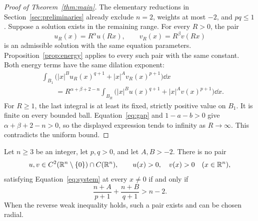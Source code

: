 \begin{proof}[Proof of Theorem~\ref{thm:main}]
The elementary reductions in Section~\ref{sec:preliminaries} already
exclude \(n=2\), weights at most \(-2\), and \(pq\le1\).
Suppose a solution exists in the remaining range. For every \(R>0\),
the pair
\[
 u_R(x)=R^\alpha u(Rx),\qquad v_R(x)=R^\beta v(Rx)
\]
is an admissible solution with the same equation parameters.
Proposition~\ref{prop:energy} applies to every such pair with the same
constant. Both energy terms have the same dilation exponent:
\begin{align*}
 &\int_{B_1}
   \bigl(|x|^B u_R(x)^{q+1}+|x|^A v_R(x)^{p+1}\bigr)\dd x\\
 &\hspace{2em}
 =R^{\alpha+\beta+2-n}
   \int_{B_R}\bigl(|x|^B u(x)^{q+1}+|x|^A v(x)^{p+1}\bigr)\dd x.
\end{align*}
For \(R\ge1\), the last integral is at least its fixed, strictly
positive value on \(B_1\). It is finite on every bounded ball.
Equation~\eqref{eq:gap} and \(1-a-b>0\) give
\(\alpha+\beta+2-n>0\), so the displayed expression tends to
infinity as \(R\to\infty\). This contradicts the uniform bound.
\end{proof}

\begin{corollary}
\label{cor:phan-classification}
Let \(n\ge3\) be an integer, let \(p,q>0\), and let \(A,B>-2\).
There is no pair
\[
 u,v\in C^2(\mathbb R^n\setminus\{0\})\cap C(\mathbb R^n),
 \qquad u(x)>0,\quad v(x)>0\quad(x\in\mathbb R^n),
\]
satisfying Equation~\eqref{eq:system} at every \(x\ne0\) if and only if
\[
 \frac{n+A}{p+1}+\frac{n+B}{q+1}>n-2.
\]
When the reverse weak inequality holds, such a pair exists and can be
chosen radial.
\end{corollary}

